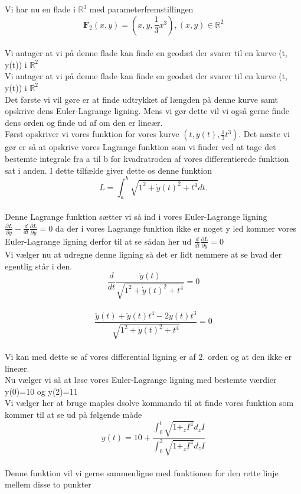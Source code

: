 
Vi har nu en flade i $\mathbb{R}^3$ med parameterfremstillingen \\
$$\textbf{F}_{2}(x,y)=(x, y, \frac{1}{3}x^3), (x,y) \in \mathbb{R}^2 $$\\
Vi antager at vi på denne flade kan finde en geodæt  der svarer til en kurve (t, y(t)) i $\mathbb{R}^2$ \\
Vi antager at vi på denne flade kan finde en geodæt  der svarer til en kurve (t, y(t)) i $\mathbb{R}^2$ \\
Det første vi vil gøre er at finde udtrykket af længden på denne kurve samt opskrive dens Euler-Lagrange ligning. Mens vi gør dette vil vi også gerne finde dens orden og finde ud af om den er lineær. \\
Først opskriver vi vores funktion for vores kurve $(t,y(t), \frac{1}{3} t^3)$. Det næste vi gør er så at opskrive vores Lagrange funktion som vi finder ved at tage det bestemte integrale fra a til b for kvadratroden af vores differentierede funktion sat i anden. I dette tilfælde giver dette os denne funktion \\
$$L=\int_{a}^{b} \sqrt{1^2+ \dot{y}(t)^2+t^4}dt. $$\\
Denne Lagrange funktion sætter vi så ind i vores Euler-Lagrange ligning $ \frac{ \partial L}{ \partial y}-  \frac{d}{dt} \frac{ \partial L}{ \partial \dot{y}}=0$ da der i vores Lagrange funktion ikke er noget y led kommer vores Euler-Lagrange ligning derfor til at se sådan her ud $ \frac{d}{dt} \frac{ \partial L}{ \partial \dot{y}}=0 $\\
Vi vælger nu at udregne denne ligning så det er lidt nemmere at se hvad der egentlig står i den. \\
$$ \frac{d}{dt} \frac{ \dot{y}(t)}{ \sqrt{1^2+ \dot{y}(t)^2+t^4}}=0  $$\\
$$ \frac{ \ddot{y}(t)+ \ddot{y}(t)t^4-2 \dot{y}(t)t^3}{\sqrt{1^2+ \dot{y}(t)^2+t^4}}=0 $$\\
Vi kan med dette se af vores differential ligning er af 2. orden og at den ikke er lineær. \\
Nu vælger vi så at løse vores Euler-Lagrange ligning med bestemte værdier y(0)=10 og y(2)=11 \\
Vi vælger her at bruge maples dsolve kommando til at finde vores funktion som kommer til at se ud på følgende måde \\
$$y(t)=10+ \frac{\int_{0}^{t}\sqrt{1+_zI^4}d_zI}{\int_{0}^{2}\sqrt{1+_zI^4}d_zI} $$ \\
Denne funktion vil vi gerne sammenligne med funktionen for den rette linje mellem disse to punkter \\
